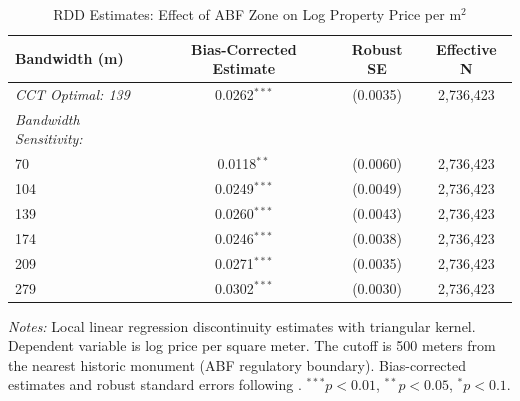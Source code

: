 \begin{table}[t]
\centering
\caption{RDD Estimates: Effect of ABF Zone on Log Property Price per m$^2$}
\label{tab:main_rdd}
\begin{tabular}{lccc}
\toprule
Bandwidth (m) & Bias-Corrected Estimate & Robust SE & Effective N \\
\midrule
\textit{CCT Optimal: 139} & 0.0262$^{***}$ & (0.0035) & 2,736,423 \\
\midrule
\textit{Bandwidth Sensitivity:} & & & \\
70 & 0.0118$^{**}$ & (0.0060) & 2,736,423 \\
104 & 0.0249$^{***}$ & (0.0049) & 2,736,423 \\
139 & 0.0260$^{***}$ & (0.0043) & 2,736,423 \\
174 & 0.0246$^{***}$ & (0.0038) & 2,736,423 \\
209 & 0.0271$^{***}$ & (0.0035) & 2,736,423 \\
279 & 0.0302$^{***}$ & (0.0030) & 2,736,423 \\
\bottomrule
\end{tabular}
\begin{tablenotes}
\item \textit{Notes:} Local linear regression discontinuity estimates with triangular kernel. Dependent variable is log price per square meter. The cutoff is 500 meters from the nearest historic monument (ABF regulatory boundary). Bias-corrected estimates and robust standard errors following \citet{CattaneoEtAl2014}. $^{***}p<0.01$, $^{**}p<0.05$, $^{*}p<0.1$.
\end{tablenotes}
\end{table}
